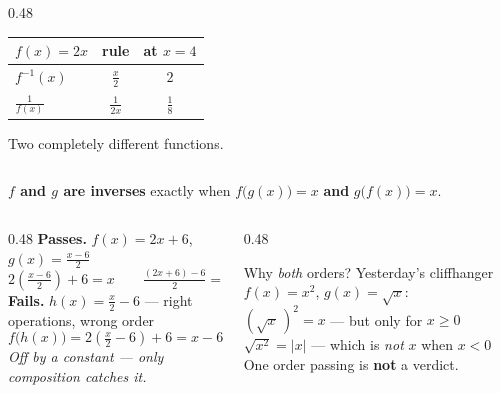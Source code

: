 \documentclass[aspectratio=169, 11pt]{beamer}
\begin{document}
\begin{frame}[t, plain]
\begin{columns}[T]
\begin{column}{0.48\textwidth}
\begin{center}
\begin{tabular}{|l|c|c|}
      \hline
      $f(x)=2x$ & rule & at $x=4$ \\ \hline
      $f^{-1}(x)$ & $\frac{x}{2}$ & $2$ \\ \hline
      $\frac{1}{f(x)}$ & $\frac{1}{2x}$ & $\frac18$ \\ \hline
      \end{tabular}
      \end{center}
      \vspace{4pt}
      \centering Two completely different functions.
    \end{column}
  \end{columns}
\end{frame}

\begin{frame}[t, plain]
  \begin{center}
    \textbf{$f$ and $g$ are inverses} \quad exactly when \quad
    $f\big(g(x)\big)=x$ \; \textbf{and} \; $g\big(f(x)\big)=x$.
  \end{center}
  \vspace{6pt}
  \begin{columns}[T]
    \begin{column}{0.48\textwidth}
      \footnotesize
      \textbf{Passes.} $f(x)=2x+6$, \; $g(x)=\frac{x-6}{2}$
      \[ 2\!\left(\tfrac{x-6}{2}\right)+6=x \qquad \tfrac{(2x+6)-6}{2}=x \]
      \vspace{2pt}
      \textbf{Fails.} $h(x)=\frac{x}{2}-6$ --- right operations, wrong order
      \[ f\big(h(x)\big)=2\!\left(\tfrac{x}{2}-6\right)+6=x-6 \]
      \centering \emph{Off by a constant --- only composition catches it.}
    \end{column}
    \begin{column}{0.48\textwidth}
      \footnotesize
      \begin{block}{Why \emph{both} orders? Yesterday's cliffhanger}
        $f(x)=x^{2}$, \; $g(x)=\sqrt{x}$: \\[4pt]
        $\left(\sqrt{x}\,\right)^{2}=x$ \quad --- but only for $x\ge0$ \\[3pt]
        $\sqrt{x^{2}}=|x|$ \quad --- which is \emph{not} $x$ when $x<0$ \\[4pt]
        One order passing is \textbf{not} a verdict.
      \end{block}
    \end{column}
  \end{columns}
\end{frame}
\end{document}
